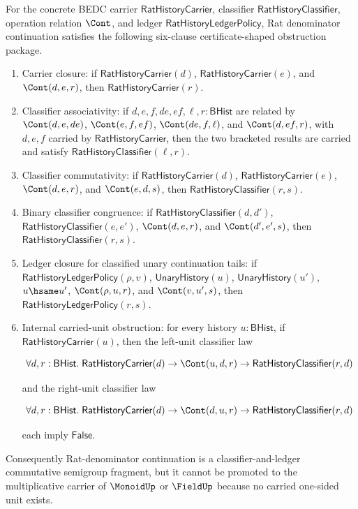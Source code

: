 \begin{theorem}
\label{thm:field-rat-denominator-continuation-full-obstruction-package}
For the concrete BEDC carrier $\mathsf{RatHistoryCarrier}$, classifier
$\mathsf{RatHistoryClassifier}$, operation relation $\Cont$, and ledger
$\mathsf{RatHistoryLedgerPolicy}$, Rat denominator continuation satisfies the
following six-clause certificate-shaped obstruction package.
\begin{enumerate}
\item Carrier closure: if $\mathsf{RatHistoryCarrier}(d)$,
$\mathsf{RatHistoryCarrier}(e)$, and $\Cont(d,e,r)$, then
$\mathsf{RatHistoryCarrier}(r)$.
\item Classifier associativity: if $d,e,f,de,ef,\ell,r:\mathsf{BHist}$ are
related by $\Cont(d,e,de)$, $\Cont(e,f,ef)$, $\Cont(de,f,\ell)$, and
$\Cont(d,ef,r)$, with $d,e,f$ carried by $\mathsf{RatHistoryCarrier}$, then the
two bracketed results are carried and satisfy
$\mathsf{RatHistoryClassifier}(\ell,r)$.
\item Classifier commutativity: if $\mathsf{RatHistoryCarrier}(d)$,
$\mathsf{RatHistoryCarrier}(e)$, $\Cont(d,e,r)$, and $\Cont(e,d,s)$, then
$\mathsf{RatHistoryClassifier}(r,s)$.
\item Binary classifier congruence: if
$\mathsf{RatHistoryClassifier}(d,d')$,
$\mathsf{RatHistoryClassifier}(e,e')$, $\Cont(d,e,r)$, and
$\Cont(d',e',s)$, then $\mathsf{RatHistoryClassifier}(r,s)$.
\item Ledger closure for classified unary continuation tails: if
$\mathsf{RatHistoryLedgerPolicy}(\rho,v)$, $\mathsf{UnaryHistory}(u)$,
$\mathsf{UnaryHistory}(u')$, $u\hsame u'$, $\Cont(\rho,u,r)$, and
$\Cont(v,u',s)$, then $\mathsf{RatHistoryLedgerPolicy}(r,s)$.
\item Internal carried-unit obstruction: for every history $u:\mathsf{BHist}$,
if $\mathsf{RatHistoryCarrier}(u)$, then the left-unit classifier law

$$
\forall d,r:\mathsf{BHist}.\;
\mathsf{RatHistoryCarrier}(d)\to
\Cont(u,d,r)\to
\mathsf{RatHistoryClassifier}(r,d)
$$

and the right-unit classifier law

$$
\forall d,r:\mathsf{BHist}.\;
\mathsf{RatHistoryCarrier}(d)\to
\Cont(d,u,r)\to
\mathsf{RatHistoryClassifier}(r,d)
$$

each imply $\mathsf{False}$.
\end{enumerate}
Consequently Rat-denominator continuation is a classifier-and-ledger
commutative semigroup fragment, but it cannot be promoted to the multiplicative
carrier of $\MonoidUp$ or $\FieldUp$ because no carried one-sided unit exists.
\end{theorem}
